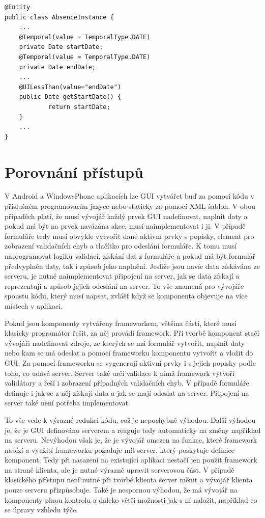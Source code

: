 \begin{lstlisting}[caption=Ukázka použití anotace @UILessThan,
label={code:uiLessThanUsage}, basicstyle=\footnotesize]
@Entity
public class AbsenceInstance {
	...
	@Temporal(value = TemporalType.DATE)
	private Date startDate;
	@Temporal(value = TemporalType.DATE)
	private Date endDate;
	...
	@UILessThan(value="endDate")
	public Date getStartDate() {
        	return startDate;
	}
	...
}
\end{lstlisting}

\section{Porovnání přístupů}
V Android a WindowsPhone aplikacích lze GUI vytvářet buď za pomocí kódu v příslušném programovacím jazyce nebo staticky za pomocí XML šablon. V obou případěch platí, že musí vývojář každý prvek GUI nadefinovat, naplnit daty a pokud má být na prvek navázána akce, musí naimplementovat i ji. V případě formuláře tedy musí obvykle vytvořit dané aktivní prvky s popisky, element pro zobrazení validačních chyb a tlačítko pro odeslání formuláře. K tomu musí naprogramovat logiku validací, získání dat z formuláře a pokud má být formulář předvyplněn daty, tak i způsob jeho naplnění. Jesliže jsou navíc data získávána ze serveru, je nutné naimplementovat připojení na server, jak se data získají a reprezentují a způsob jejich odeslání na server. To vše znamená pro vývojáře spoustu kódu, který musí napsat, zvlášť když se komponenta objevuje na více místech v aplikaci. 

Pokud jsou komponenty vytvářeny frameworkem, většina částí, které musí klasicky programátor řešit, za něj provádí framework. Při tvorbě komponent stačí vývojáři nadefinovat zdroje, ze kterých se má formulář vytvořit, naplnit daty nebo kam se má odeslat a pomocí frameworku komponentu vytvořit a vložit do GUI. Za pomocí frameworku se vygenerují aktivní prvky i s jejich popisky podle toho, co udává server. Server také určí validace k nimž framework vytvoří validátory a řeší i zobrazení případných validačních chyb. V případě formuláře definuje i jak se z něj získají data a jak se mají odeslat na server. Připojení na server také není potřeba implementovat. 

To vše vede k výrazné redukci kódu, což je nepochybně výhodou. Další výhodou je, že je GUI definováno serverem a reaguje tedy automaticky na změny například na serveru. Nevýhodou však je, že je vývojář omezen na funkce, které framework nabízí a využití frameworku požaduje mít server, který poskytuje definice komponent. Tedy při nasazení na existující aplikaci nestačí jen použít framework na straně klienta, ale je nutné výrazně upravit serverovou část. V případě klasického přístupu není nutné při tvorbě klienta server měnit a vývojář klienta pouze serveru přizpůsobuje. Také je nespornou výhodou, že má vývojář na komponenty plnou kontrolu a daleko větší možnosti jak s ní naložit, například co se úpravy vzhledu týče.
  
